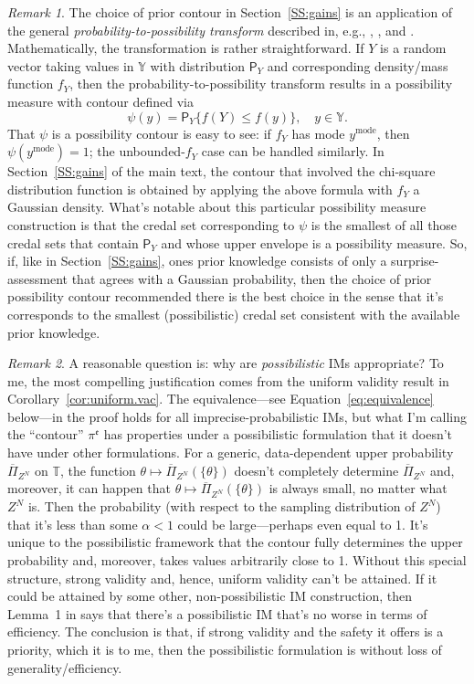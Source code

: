 \documentclass[a4paper, 12pt]{article}
\theoremstyle{plain}
\theoremstyle{definition}
\theoremstyle{remark}
\newtheorem{remark}{Remark}
\newcommand{\prob}{\mathsf{P}}
\newcommand{\YY}{\mathbb{Y}}
\newcommand{\TT}{\mathbb{T}}
\newcommand{\uPi}{\overline{\Pi}}
\newcommand{\eval}{\mathfrak{e}}
\begin{document}
\begin{remark}
\label{re:prob.to.poss}
The choice of prior contour in Section~\ref{SS:gains} is an application of the general {\em probability-to-possibility transform} described in, e.g., \citet{dubois.etal.2004}, \citet{hose.hanss.2021}, and \citet{hose2022thesis}.  Mathematically, the transformation is rather straightforward.  If $Y$ is a random vector taking values in $\YY$ with distribution $\prob_Y$ and corresponding density/mass function $f_Y$, then the probability-to-possibility transform results in a possibility measure with contour defined via  
\[ \psi(y) = \prob_Y\{ f(Y) \leq f(y) \}, \quad y \in \YY. \]
That $\psi$ is a possibility contour is easy to see: if $f_Y$ has mode $y^\text{mode}$, then $\psi(y^\text{mode})=1$; the unbounded-$f_Y$ case can be handled similarly.  In Section~\ref{SS:gains} of the main text, the contour that involved the chi-square distribution function is obtained by applying the above formula with $f_Y$ a Gaussian density.  What's notable about this particular possibility measure construction is that the credal set corresponding to $\psi$ is the smallest of all those credal sets that contain $\prob_Y$ and whose upper envelope is a possibility measure.  So, if, like in Section~\ref{SS:gains}, ones prior knowledge consists of only a surprise-assessment that agrees with a Gaussian probability, then the choice of prior possibility contour recommended there is the best choice in the sense that it's corresponds to the smallest (possibilistic) credal set consistent with the available prior knowledge.  
\end{remark}

\begin{remark}
\label{re:why.possibility}
A reasonable question is: why are {\em possibilistic} IMs appropriate?  To me, the most compelling justification comes from the uniform validity result in Corollary~\ref{cor:uniform.vac}.  The equivalence---see Equation~\eqref{eq:equivalence} below---in the proof holds for all imprecise-probabilistic IMs, but what I'm calling the ``contour'' $\pi^\eval$ has properties under a possibilistic formulation that it doesn't have under other formulations.  For a generic, data-dependent upper probability $\uPi_{Z^N}$ on $\TT$, the function $\theta \mapsto \uPi_{Z^N}(\{\theta\})$ doesn't completely determine $\uPi_{Z^N}$ and, moreover, it can happen that $\theta \mapsto \uPi_{Z^N}(\{\theta\})$ is always small, no matter what $Z^N$ is.  Then the probability (with respect to the sampling distribution of $Z^N$) that it's less than some $\alpha < 1$ could be large---perhaps even equal to 1.  It's unique to the possibilistic framework that the contour fully determines the upper probability and, moreover, takes values arbitrarily close to 1.  Without this special structure, strong validity and, hence, uniform validity can't be attained.  If it could be attained by some other, non-possibilistic IM construction, then Lemma~1 in \citet{martin.partial2} says that there's a possibilistic IM that's no worse in terms of efficiency.  The conclusion is that, if strong validity and the safety it offers is a priority, which it is to me, then the possibilistic formulation is without loss of generality/efficiency.  
\end{remark}
\end{document}
